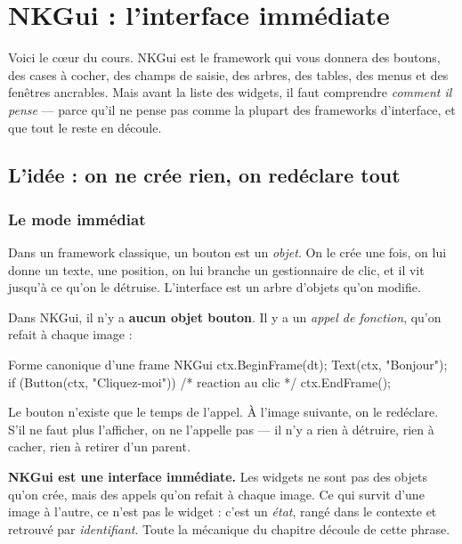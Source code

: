 \chapter{NKGui : l'interface immédiate}

Voici le cœur du cours. NKGui est le framework qui vous donnera des boutons, des
cases à cocher, des champs de saisie, des arbres, des tables, des menus et des
fenêtres ancrables. Mais avant la liste des widgets, il faut comprendre
\emph{comment il pense} — parce qu'il ne pense pas comme la plupart des
frameworks d'interface, et que tout le reste en découle.

\section{L'idée : on ne crée rien, on redéclare tout}

\subsection{Le mode immédiat}

Dans un framework classique, un bouton est un \emph{objet}. On le crée une fois,
on lui donne un texte, une position, on lui branche un gestionnaire de clic, et
il vit jusqu'à ce qu'on le détruise. L'interface est un arbre d'objets qu'on
modifie.

Dans NKGui, il n'y a \textbf{aucun objet bouton}. Il y a un \emph{appel de
fonction}, qu'on refait à chaque image :

\begin{nkcode}{Forme canonique d'une frame NKGui}
ctx.BeginFrame(dt);
    Text(ctx, "Bonjour");
    if (Button(ctx, "Cliquez-moi")) {
        /* reaction au clic */
    }
ctx.EndFrame();
\end{nkcode}

Le bouton n'existe que le temps de l'appel. À l'image suivante, on le
redéclare. S'il ne faut plus l'afficher, on ne l'appelle pas — il n'y a rien à
détruire, rien à cacher, rien à retirer d'un parent.

\begin{nkretenir}
\textbf{NKGui est une interface immédiate.} Les widgets ne sont pas des objets
qu'on crée, mais des appels qu'on refait à chaque image. Ce qui survit d'une
image à l'autre, ce n'est pas le widget : c'est un \emph{état}, rangé dans le
contexte et retrouvé par \emph{identifiant}. Toute la mécanique du chapitre
découle de cette phrase.
\end{nkretenir}

